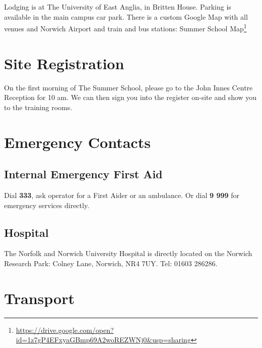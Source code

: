 \documentclass[12pt,]{book}
\let\rmarkdownfootnote\footnote%
\def\footnote{\protect\rmarkdownfootnote}
\renewcommand{\href}[2]{#2\footnote{\url{#1}}}
\begin{document}
Lodging is at The University of East Anglia, in Britten House. Parking
is available in the main campus car park. There is a custom Google Map
with all venues and Norwich Airport and train and bus stations:
\href{https://drive.google.com/open?id=1z7gP4EFxyaGBmp69A2woREZWNj0\&usp=sharing}{Summer
School Map}

\section*{Site Registration}\label{site-registration}

On the first morning of The Summer School, please go to the John Innes
Centre Reception for 10 am. We can then sign you into the register
on-site and show you to the training rooms.

\section*{Emergency Contacts}\label{emergency-contacts}

\subsection*{Internal Emergency First
Aid}\label{internal-emergency-first-aid}

Dial \textbf{333}, ask operator for a First Aider or an ambulance. Or
dial \textbf{9 999} for emergency services directly.

\subsection*{Hospital}\label{hospital}

The Norfolk and Norwich University Hospital is directly located on the
Norwich Research Park: Colney Lane, Norwich, NR4 7UY. Tel: 01603 286286.

\section*{Transport}\label{transport}
\end{document}
